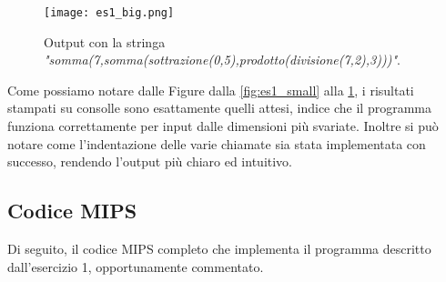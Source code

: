        	\begin{figure}[h!]
       		\begin{center}
       			\texttt{[image: es1\_big.png]}
       		\end{center}
       		\caption{Output con la stringa \textit{"somma(7,somma(sottrazione(0,5),prodotto(divisione(7,2),3)))"}.}
       		\label{fig:es1_big}
       	\end{figure}
       	
       	Come possiamo notare dalle Figure dalla \ref{fig:es1_small} alla \ref{fig:es1_big}, i risultati stampati su consolle sono esattamente quelli attesi, indice che il programma funziona correttamente per input dalle dimensioni più svariate. Inoltre si può notare come l'indentazione delle varie chiamate sia stata implementata con successo, rendendo l'output più chiaro ed intuitivo.
       	
       	\FloatBarrier
       	
    \subsection*{Codice MIPS}
		
		Di seguito, il codice MIPS completo che implementa il programma descritto dall'esercizio 1, opportunamente commentato.
		
